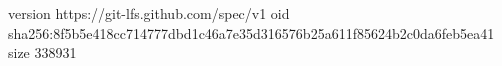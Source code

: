 version https://git-lfs.github.com/spec/v1
oid sha256:8f5b5e418cc714777dbd1c46a7e35d316576b25a611f85624b2c0da6feb5ea41
size 338931
